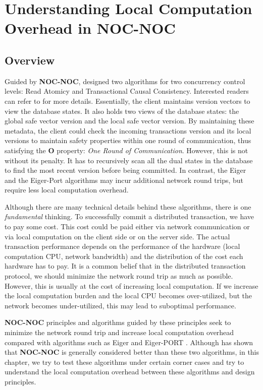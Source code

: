 \chapter{Understanding Local Computation Overhead in NOC-NOC}
\section{Overview}

Guided by \textbf{NOC-NOC}, \cite{multazzu2023nocs} designed two algorithms for two concurrency control levels: Read Atomicy and Transactional Causal Consistency. Interested readers can refer to \cite{multazzu2023nocs} for more details. Essentially, the client maintains version vectors to view the database states.  It also holds two views of the database states: the global safe vector version and the local safe vector version. By maintaining these metadata, the client could check the incoming transactions version and its local versions to maintain safety properties within one round of communication, thus satisfying the \textbf{O} property: \textit{One Round of Communication}. However, this is not without its penalty. It has to recursively scan all the dual states in the database to find the most recent version before being committed.  In contrast, the Eiger \cite{lloyd2013stronger} and the Eiger-Port \cite{lu2020performance} algorithms may incur additional network round trips, but require less local computation overhead. 


Although there are many technical details behind these algorithms, there is one \textit{fundamental} thinking.  To successfully commit a distributed transaction, we have to pay some cost. This cost could be paid either via network communication or via local computation on the client side or on the server side. The actual transaction performance depends on the performance of the hardware (local computation CPU, network bandwidth) and the distribution of the cost each hardware has to pay. It is a common belief that in the distributed transaction protocol, we should minimize the network round trip as much as possible. However, this is usually at the cost of increasing local computation. If we increase the local computation burden and the local CPU becomes over-utilized, but the network becomes under-utilized, this may lead to suboptimal performance.

\textbf{NOC-NOC} principles and algorithms guided by these principles seek to minimize the network round trip and increase local computation overhead compared with algorithms such as Eiger \cite{lloyd2013stronger} and Eiger-PORT \cite{lu2020performance}. Although \cite{multazzu2023nocs} has shown that \textbf{NOC-NOC} is generally considered better than these two algorithms, in this chapter, we try to test these algorithms under certain corner cases and try to understand the local computation overhead between these algorithms and design principles.
